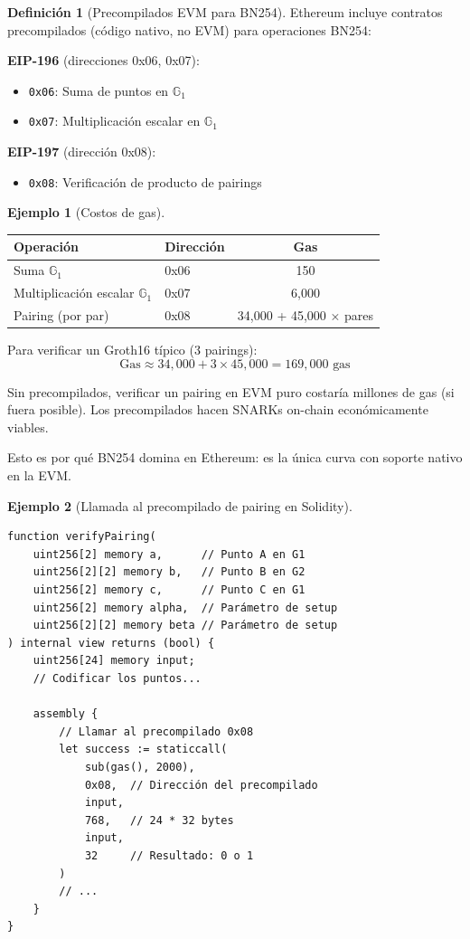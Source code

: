 \documentclass[11pt,a4paper,twoside,openright]{book}
\theoremstyle{definition}
\newtheorem{definition}{Definición}[chapter]
\newtheorem{example}{Ejemplo}[chapter]
\theoremstyle{plain}
\theoremstyle{remark}
\newcommand{\G}{\mathbb{G}}
\begin{document}
\begin{definition}[Precompilados EVM para BN254]
Ethereum incluye contratos precompilados (código nativo, no EVM) para operaciones BN254:

\textbf{EIP-196} (direcciones 0x06, 0x07):
\begin{itemize}
    \item \texttt{0x06}: Suma de puntos en $\G_1$
    \item \texttt{0x07}: Multiplicación escalar en $\G_1$
\end{itemize}

\textbf{EIP-197} (dirección 0x08):
\begin{itemize}
    \item \texttt{0x08}: Verificación de producto de pairings
\end{itemize}
\end{definition}

\begin{example}[Costos de gas]
\begin{center}
\begin{tabular}{llc}
\toprule
\textbf{Operación} & \textbf{Dirección} & \textbf{Gas} \\
\midrule
Suma $\G_1$ & 0x06 & 150 \\
Multiplicación escalar $\G_1$ & 0x07 & 6,000 \\
Pairing (por par) & 0x08 & 34,000 + 45,000 × pares \\
\bottomrule
\end{tabular}
\end{center}

Para verificar un Groth16 típico (3 pairings):
\[ \text{Gas} \approx 34,000 + 3 \times 45,000 = 169,000 \text{ gas} \]
\end{example}

\begin{keyidea}
Sin precompilados, verificar un pairing en EVM puro costaría millones de gas (si fuera posible). Los precompilados hacen SNARKs on-chain económicamente viables.

Esto es por qué BN254 domina en Ethereum: es la única curva con soporte nativo en la EVM.
\end{keyidea}

\begin{example}[Llamada al precompilado de pairing en Solidity]
\begin{verbatim}
function verifyPairing(
    uint256[2] memory a,      // Punto A en G1
    uint256[2][2] memory b,   // Punto B en G2
    uint256[2] memory c,      // Punto C en G1
    uint256[2] memory alpha,  // Parámetro de setup
    uint256[2][2] memory beta // Parámetro de setup
) internal view returns (bool) {
    uint256[24] memory input;
    // Codificar los puntos...
    
    assembly {
        // Llamar al precompilado 0x08
        let success := staticcall(
            sub(gas(), 2000),
            0x08,  // Dirección del precompilado
            input,
            768,   // 24 * 32 bytes
            input,
            32     // Resultado: 0 o 1
        )
        // ...
    }
}
\end{verbatim}
\end{example}
\end{document}
